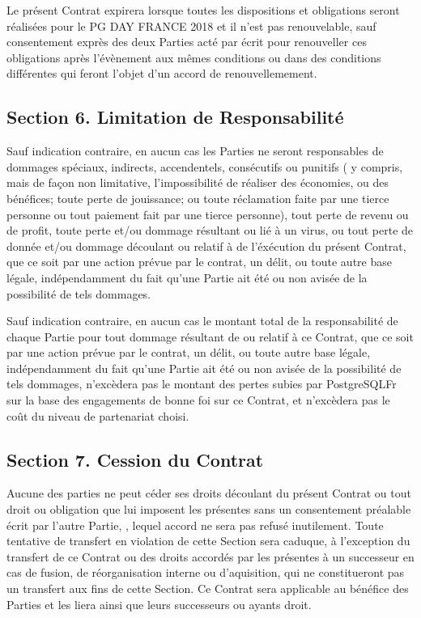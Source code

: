\documentclass[]{article}
\begin{document}
Le présent Contrat expirera lorsque toutes les dispositions et
obligations seront réalisées pour le PG DAY FRANCE 2018 et il n'est pas
renouvelable, sauf consentement exprès des deux Parties acté par écrit
pour renouveller ces obligations après l'évènement aux mêmes conditions
ou dans des conditions différentes qui feront l'objet d'un accord de
renouvellemement.

\hypertarget{section-6.-limitation-de-responsabilituxe9}{%
\subsection{Section 6. Limitation de
Responsabilité}\label{section-6.-limitation-de-responsabilituxe9}}

Sauf indication contraire, en aucun cas les Parties ne seront
responsables de dommages spéciaux, indirects, accendentels, consécutifs
ou punitifs ( y compris, mais de façon non limitative, l'impossibilité
de réaliser des économies, ou des bénéfices; toute perte de jouissance;
ou toute réclamation faite par une tierce personne ou tout paiement fait
par une tierce personne), tout perte de revenu ou de profit, toute perte
et/ou dommage résultant ou lié à un virus, ou tout perte de donnée et/ou
dommage découlant ou relatif à de l'éxécution du présent Contrat, que ce
soit par une action prévue par le contrat, un délit, ou toute autre base
légale, indépendamment du fait qu'une Partie ait été ou non avisée de la
possibilité de tels dommages.

Sauf indication contraire, en aucun cas le montant total de la
responsabilité de chaque Partie pour tout dommage résultant de ou
relatif à ce Contrat, que ce soit par une action prévue par le contrat,
un délit, ou toute autre base légale, indépendamment du fait qu'une
Partie ait été ou non avisée de la possibilité de tels dommages,
n'excèdera pas le montant des pertes subies par PostgreSQLFr sur la base
des engagements de bonne foi sur ce Contrat, et n'excèdera pas le coût
du niveau de partenariat choisi.

\hypertarget{section-7.-cession-du-contrat}{%
\subsection{Section 7. Cession du
Contrat}\label{section-7.-cession-du-contrat}}

Aucune des parties ne peut céder ses droits découlant du présent Contrat
ou tout droit ou obligation que lui imposent les présentes sans un
consentement préalable écrit par l'autre Partie, , lequel accord ne sera
pas refusé inutilement. Toute tentative de transfert en violation de
cette Section sera caduque, à l'exception du transfert de ce Contrat ou
des droits accordés par les présentes à un successeur en cas de fusion,
de réorganisation interne ou d'aquisition, qui ne constitueront pas un
transfert aux fins de cette Section. Ce Contrat sera applicable au
bénéfice des Parties et les liera ainsi que leurs successeurs ou ayants
droit.
\end{document}
